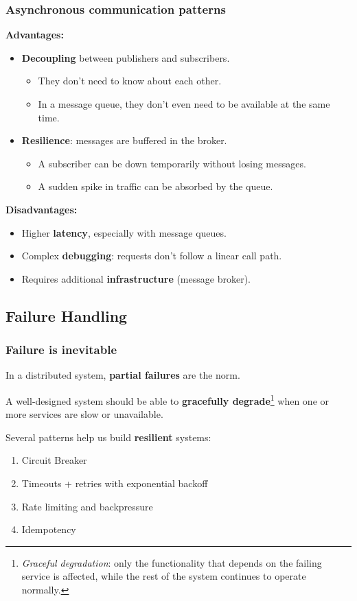 \documentclass{beamer}
\begin{document}
\begin{frame}
  \frametitle{Asynchronous communication patterns}

  \textbf{Advantages:}
  \begin{itemize}
    \item \textbf{Decoupling} between publishers and subscribers.
    \begin{itemize}
      \item They don't need to know about each other.
      \item In a message queue, they don't even need to be available at the same time.
    \end{itemize} 
    \item \textbf{Resilience}: messages are buffered in the broker.
    \begin{itemize}
      \item A subscriber can be down temporarily without losing messages.
      \item A sudden spike in traffic can be absorbed by the queue.
    \end{itemize}
  \end{itemize}

  \textbf{Disadvantages:}
  \begin{itemize}
    \item Higher \textbf{latency}, especially with message queues.
    \item Complex \textbf{debugging}: requests don't follow a linear call path.
    \item Requires additional \textbf{infrastructure} (message broker).
  \end{itemize}

\end{frame}

\subsection{Failure Handling}

\begin{frame}
  \frametitle{Failure is inevitable}

  In a distributed system, \textbf{partial failures} are the norm.

  A well-designed system should be able to \textbf{gracefully degrade}\footnote{\textit{Graceful degradation}: only the functionality that depends on the failing service is affected, while the rest of the system continues to operate normally.} when one or more services are slow or unavailable.
  \newline

  Several patterns help us build \textbf{resilient} systems:
  \begin{enumerate}
    \item Circuit Breaker
    \item Timeouts + retries with exponential backoff
    \item Rate limiting and backpressure
    \item Idempotency
  \end{enumerate}

\end{frame}
\end{document}
